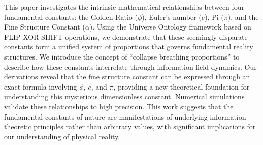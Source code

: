 This paper investigates the intrinsic mathematical relationships between four fundamental constants: the Golden Ratio ($\phi$), Euler's number ($e$), Pi ($\pi$), and the Fine Structure Constant ($\alpha$). Using the Universe Ontology framework based on FLIP-XOR-SHIFT operations, we demonstrate that these seemingly disparate constants form a unified system of proportions that governs fundamental reality structures. We introduce the concept of ``collapse breathing proportions'' to describe how these constants interrelate through information field dynamics. Our derivations reveal that the fine structure constant can be expressed through an exact formula involving $\phi$, $e$, and $\pi$, providing a new theoretical foundation for understanding this mysterious dimensionless constant. Numerical simulations validate these relationships to high precision. This work suggests that the fundamental constants of nature are manifestations of underlying information-theoretic principles rather than arbitrary values, with significant implications for our understanding of physical reality. 